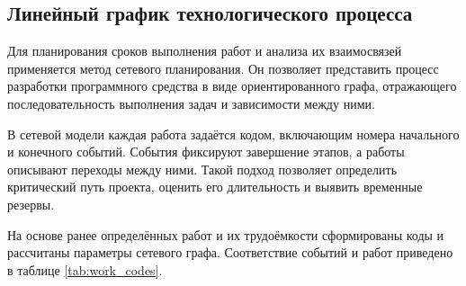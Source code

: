 \subsection{Линейный график технологического процесса}

Для планирования сроков выполнения работ и анализа их взаимосвязей применяется метод сетевого планирования. Он позволяет представить процесс разработки программного средства в виде ориентированного графа, отражающего последовательность выполнения задач и зависимости между ними.

В сетевой модели каждая работа задаётся кодом, включающим номера начального и конечного событий. События фиксируют завершение этапов, а работы описывают переходы между ними. Такой подход позволяет определить критический путь проекта, оценить его длительность и выявить временные резервы.

На основе ранее определённых работ и их трудоёмкости сформированы коды и рассчитаны параметры сетевого графа. Соответствие событий и работ приведено в таблице \ref{tab:work_codes}.

